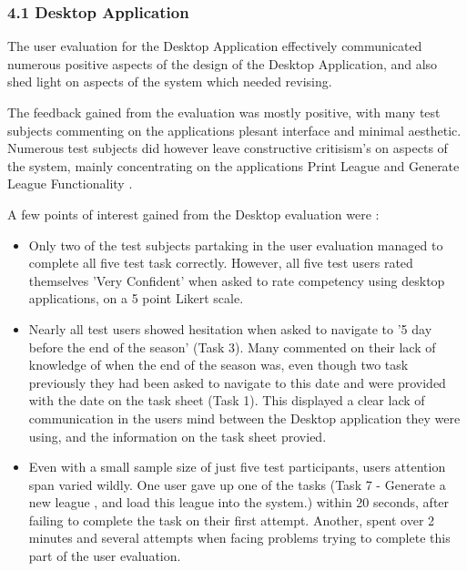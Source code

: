 \subsubsection{4.1 Desktop Application}

The user evaluation for the Desktop Application effectively communicated numerous positive aspects of the design of the Desktop Application, and also shed light on aspects of the system which needed revising.

 The feedback gained from the evaluation was mostly positive, with many test subjects commenting on the applications plesant interface and minimal aesthetic. Numerous test subjects did however leave constructive critisism's on aspects of the system, mainly concentrating on the applications Print League and Generate League Functionality . 

A few points of interest gained from the Desktop evaluation were : 

\begin{itemize}

\item Only two of the test subjects partaking in the user evaluation managed to complete all five test task correctly. However, all five test users rated themselves 'Very Confident' when asked to rate competency using desktop applications, on a 5 point Likert scale. 

\item Nearly all test users showed hesitation when asked to navigate to '5 day before the end of the season' (Task 3). Many commented on their lack of knowledge of when the end of the season was, even though two task previously they had been asked to navigate to this date and were provided with the date on the task sheet (Task 1). This displayed a clear lack of communication in the users mind between the Desktop application they were using, and the information on the task sheet provied. 
     
\item Even with a small sample size of just five test participants, users attention span varied wildly. One user gave up one of the tasks (Task 7 - Generate a new league , and load this league into the system.) within 20 seconds, after failing to complete the task on their first attempt. Another, spent over 2 minutes and several attempts when facing problems trying to complete this part of the user evaluation.     

\end{itemize}



